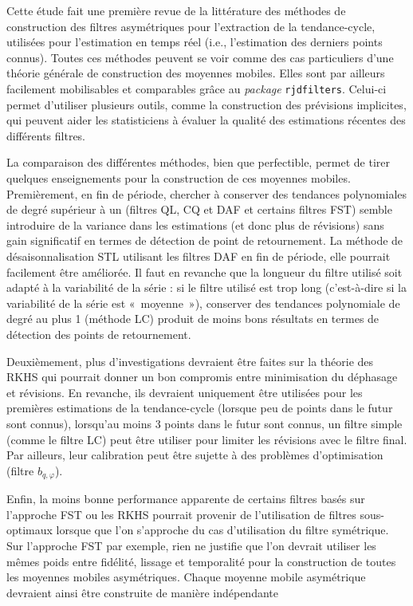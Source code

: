\documentclass[
  12pt,
  a4paper,french]{article}
\newcommand\1{\mathds{1}}
\begin{document}
Cette étude fait une première revue de la littérature des méthodes de construction des filtres asymétriques pour l'extraction de la tendance-cycle, utilisées pour l'estimation en temps réel (i.e., l'estimation des derniers points connus).
Toutes ces méthodes peuvent se voir comme des cas particuliers d'une théorie générale de construction des moyennes mobiles.
Elles sont par ailleurs facilement mobilisables et comparables grâce au \emph{package}  \texttt{rjdfilters}.
Celui-ci permet d'utiliser plusieurs outils, comme la construction des prévisions implicites, qui peuvent aider les statisticiens à évaluer la qualité des estimations récentes des différents filtres.

La comparaison des différentes méthodes, bien que perfectible, permet de tirer quelques enseignements pour la construction de ces moyennes mobiles.
Premièrement, en fin de période, chercher à conserver des tendances polynomiales de degré supérieur à un (filtres QL, CQ et DAF et certains filtres FST) semble introduire de la variance dans les estimations (et donc plus de révisions) sans gain significatif en termes de détection de point de retournement.
La méthode de désaisonnalisation STL utilisant les filtres DAF en fin de période, elle pourrait facilement être améliorée.
Il faut en revanche que la longueur du filtre utilisé soit adapté à la variabilité de la série : si le filtre utilisé est trop long (c'est-à-dire si la variabilité de la série est «~moyenne~»), conserver des tendances polynomiale de degré au plus 1 (méthode LC) produit de moins bons résultats en termes de détection des points de retournement.

Deuxièmement, plus d'investigations devraient être faites sur la théorie des RKHS qui pourrait donner un bon compromis entre minimisation du déphasage et révisions.
En revanche, ils devraient uniquement être utilisées pour les premières estimations de la tendance-cycle (lorsque peu de points dans le futur sont connus), lorsqu'au moins 3 points dans le futur sont connus, un filtre simple (comme le filtre LC) peut être utiliser pour limiter les révisions avec le filtre final.
Par ailleurs, leur calibration peut être sujette à des problèmes d'optimisation (filtre \(b_{q,\varphi}\)).

Enfin, la moins bonne performance apparente de certains filtres basés sur l'approche FST ou les RKHS pourrait provenir de l'utilisation de filtres sous-optimaux lorsque que l'on s'approche du cas d'utilisation du filtre symétrique.
Sur l'approche FST par exemple, rien ne justifie que l'on devrait utiliser les mêmes poids entre fidélité, lissage et temporalité pour la construction de toutes les moyennes mobiles asymétriques.
Chaque moyenne mobile asymétrique devraient ainsi être construite de manière indépendante
\end{document}
